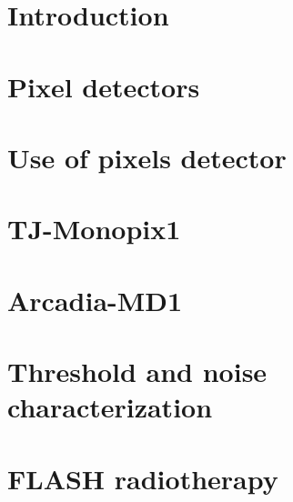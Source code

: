 \documentclass[a4paper]{report}
\begin{document}
\tableofcontents



\chapter{Introduction}


\chapter{Pixel detectors}


\chapter{Use of pixels detector}


\chapter{TJ-Monopix1}


\chapter{Arcadia-MD1}


\chapter{Threshold and noise characterization}


\appendix
\chapter{FLASH radiotherapy}



\printbibliography
\end{document}
